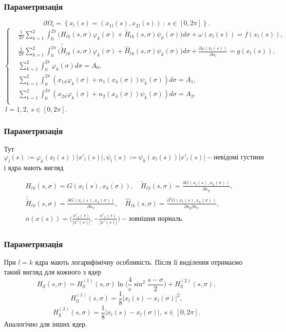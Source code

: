 \documentclass[10pt]{beamer}
\begin{document}
\begin{frame}
\frametitle{Параметризація}
$$\partial\Omega_l=\left\{x_l(s)=(x_1{_l}(s),x_2{_l}(s)) \ : \ s\in [0,2\pi]\right\}.$$
 \begin{equation}
 		\left\{
	 	\begin{split}
		\label{paramSystem}
	 		&\frac{1}{2\pi}\sum_{k=1}^{2}\int_{0}^{2\pi}\bigg(H_l{_k}(s, \sigma)\varphi_k(\sigma)+\tilde{H}_l{_k}(s, \sigma)\psi_k(\sigma)\bigg)d\sigma+\omega(x_l(s))=f(x_l(s)), \\
			&\frac{1}{2\pi}\sum_{k=1}^{2}\int_{0}^{2\pi}\bigg(\tilde{\tilde{H}}_l{_k}(s, \sigma)\varphi_k(\sigma)+\hat{H}_l{_k}(s, \sigma)\psi_k(\sigma)\bigg)d\sigma+\frac{\partial\omega(x_l(s))}{\partial n_l}=g(x_l(s)), \\
			&\sum_{k=1}^{2}\int_{0}^{2\pi}\varphi_k(\sigma)d\sigma=A_0, \\
			&\sum_{k=1}^{2}\int_{0}^{2\pi}(x_1{_k}\varphi_k(\sigma)+n_1(x_k(\sigma))\psi_k(\sigma))d\sigma=A_1, \\
			&\sum_{k=1}^{2}\int_{0}^{2\pi}(x_2{_k}\varphi_k(\sigma)+n_2(x_k(\sigma))\psi_k(\sigma))d\sigma=A_2, \\
		\end{split}
		\right.
\end{equation}
$\ l=1,2, \ s\in [0,2\pi]$.
\end{frame}

\begin{frame}
\frametitle{Параметризація}
Тут $ \label{kernels} \varphi_l(s) :=\varphi_k(x_l(s))|x'_l(s)|,  \psi_l(s) :=\psi_k(x_l(s))|x'_l(s)| - \textrm{невідомі густини} $ і ядра мають вигляд
 
 \begin{equation}
 \begin{split}
	&H_l{_k}(s, \sigma) = G(x_l(s),x_k(\sigma)), \quad \tilde{H}_l{_k}(s, \sigma)=\frac{\partial G(x_l(s),x_k(\sigma))}{\partial n_y}, \\
	&\tilde{\tilde{H}}_l{_k}(s, \sigma)=\frac{\partial G(x_l(s),x_k(\sigma))}{\partial n_x}, \quad \hat{H}_l{_k}(s, \sigma)=\frac{\partial^2 G(x_l(s),x_k(\sigma))}{\partial n_y\partial n_x}, \\
	&n(x(s))=\Big(\frac{x'_2(s)}{|x'(s)|},-\frac{x'_1(s)}{|x'(s)|}\Big) - \textrm{зовнішня нормаль.} \nonumber
 \end{split}
 \end{equation}
\end{frame}

\begin{frame}
\frametitle{Параметризація}
При $l=k$ ядра мають логарифімічну особливість. Після її виділення отримаємо такий вигляд для кожного з ядер
$$
H_{ll}(s, \sigma)=H^{(1)}_{ll}(s, \sigma)\ln\bigg(\frac{4}{e}\sin^2\frac{s-\sigma}{2}\bigg)+H^{(2)}_{ll}(s, \sigma),
$$
$$
H^{(1)}_{ll}(s, \sigma)=\frac{1}{8}|x_l(s)-x_l(\sigma)|^2,
$$
$$
H^{(2)}_{ll}(s, \sigma)=\frac{1}{8}|x_l(s)-x_l(\sigma)|, \ s\in [0,2\pi].
$$
Аналогічно для інших ядер.
\end{frame}
 
\end{document}
